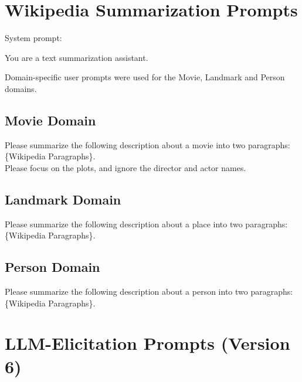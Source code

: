 \onecolumn  %


\section{Wikipedia Summarization Prompts}
System prompt:
\begin{tcolorbox}
You are a text summarization assistant.
\end{tcolorbox}
\noindent
Domain-specific user prompts were used for the Movie, Landmark and Person domains.

\subsection{Movie Domain}
\begin{tcolorbox}
Please summarize the following description about a movie into two paragraphs:\\ \{Wikipedia Paragraphs\}.\\Please focus on the plots, and ignore the director and actor names.
\end{tcolorbox}


\subsection{Landmark Domain}
\begin{tcolorbox}
Please summarize the following description about a place into two paragraphs:\\ \{Wikipedia Paragraphs\}.
\end{tcolorbox}

\subsection{Person Domain}
\begin{tcolorbox}
Please summarize the following description about a person into two paragraphs:\\ \{Wikipedia Paragraphs\}.
\end{tcolorbox}

\newpage

\section{LLM-Elicitation Prompts (Version 6)}

